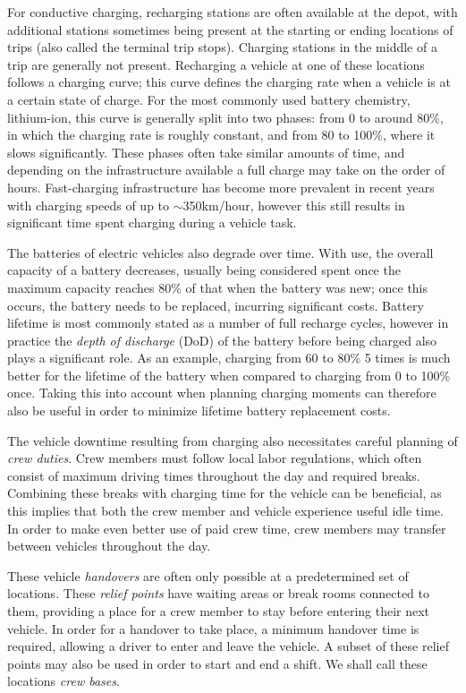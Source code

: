 \documentclass[]{article}
\begin{document}
For conductive charging, recharging stations are often available at the depot, with additional stations sometimes being present at the starting or ending locations of trips (also called the terminal trip stops). Charging stations in the middle of a trip are generally not present. Recharging a vehicle at one of these locations follows a charging curve; this curve defines the charging rate when a vehicle is at a certain state of charge. For the most commonly used battery chemistry, lithium-ion, this curve is generally split into two phases: from 0 to around 80\%, in which the charging rate is roughly constant, and from 80 to 100\%, where it slows significantly. These phases often take similar amounts of time, and depending on the infrastructure available a full charge may take on the order of hours. Fast-charging infrastructure has become more prevalent in recent years with charging speeds of up to $\sim$350km/hour, however this still results in significant time spent charging during a vehicle task.

The batteries of electric vehicles also degrade over time. With use, the overall capacity of a battery decreases, usually being considered spent once the maximum capacity reaches 80\% of that when the battery was new; once this occurs, the battery needs to be replaced, incurring significant costs. Battery lifetime is most commonly stated as a number of full recharge cycles, however in practice the \emph{depth of discharge} (DoD) of the battery before being charged also plays a significant role. As an example, charging from 60 to 80\% 5 times is much better for the lifetime of the battery when compared to charging from 0 to 100\% once. Taking this into account when planning charging moments can therefore also be useful in order to minimize lifetime battery replacement costs.

The vehicle downtime resulting from charging also necessitates careful planning of \emph{crew duties}. Crew members must follow local labor regulations, which often consist of maximum driving times throughout the day and required breaks. Combining these breaks with charging time for the vehicle can be beneficial, as this implies that both the crew member and vehicle experience useful idle time. In order to make even better use of paid crew time, crew members may transfer between vehicles throughout the day.

These vehicle \emph{handovers} are often only possible at a predetermined set of locations. These \emph{relief points} have waiting areas or break rooms connected to them, providing a place for a crew member to stay before entering their next vehicle. In order for a handover to take place, a minimum handover time is required, allowing a driver to enter and leave the vehicle. A subset of these relief points may also be used in order to start and end a shift. We shall call these locations \emph{crew bases}. 
\end{document}
